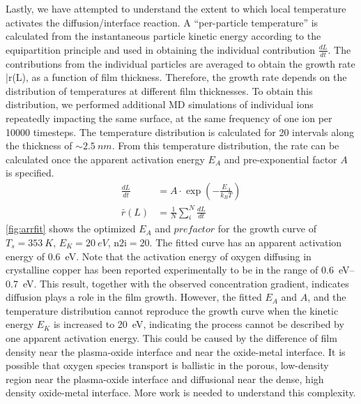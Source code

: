 \documentclass[manuscript=cmatex]{achemso}
\begin{document}
Lastly, we have attempted to understand the extent to which local temperature activates the diffusion/interface reaction. A ``per-particle temperature'' is calculated from the instantaneous particle kinetic energy according to the equipartition principle and used in obtaining the individual contribution $\frac{dL}{dt}$. The contributions from the individual particles are averaged to obtain the growth rate \bar{r}(L), as a function of film thickness. Therefore, the growth rate depends on the distribution of temperatures at different film thicknesses. To obtain this distribution, we performed additional MD simulations of individual ions repeatedly impacting the same surface, at the same frequency of one ion per 10000 timesteps. The temperature distribution is calculated for 20 intervals along the thickness of $\sim \SI{2.5}{nm}$. From this temperature distribution, the rate can be calculated once the apparent activation energy $E_A$ and pre-exponential factor $A$ is specified. 
\begin{align*}
  \frac{dL}{dt} &= A\cdot \exp(-\frac{E_A}{k_BT}) \\
  \bar{r}(L) &= \frac{1}{N}\sum_{i}^{N}{\frac{dL}{dt}}
\end{align*}
\cref{fig:arrfit} shows the optimized $E_A$ and $prefactor$ for the growth curve of $T_s=\SI{353}{K}$, $E_K=\SI{20}{eV}$, $\mathrm{n2i}=20$. The fitted curve has an apparent activation energy of \SI{0.6}{eV}. Note that the activation energy of oxygen diffusing in crystalline copper has been reported experimentally to be in the range of \SIrange{0.6}{0.7}{eV}. This result, together with the observed concentration gradient, indicates diffusion plays a role in the film growth. However, the fitted $E_A$ and $A$, and the temperature distribution cannot reproduce the growth curve when the kinetic energy $E_K$ is increased to \SI{20}{eV}, indicating the process cannot be described by one apparent activation energy. This could be caused by the difference of film density near the plasma-oxide interface and near the oxide-metal interface. It is possible that oxygen species transport is ballistic in the porous, low-density region near the plasma-oxide interface and diffusional near the dense, high density oxide-metal interface. More work is needed to understand this complexity. 

\end{document}
